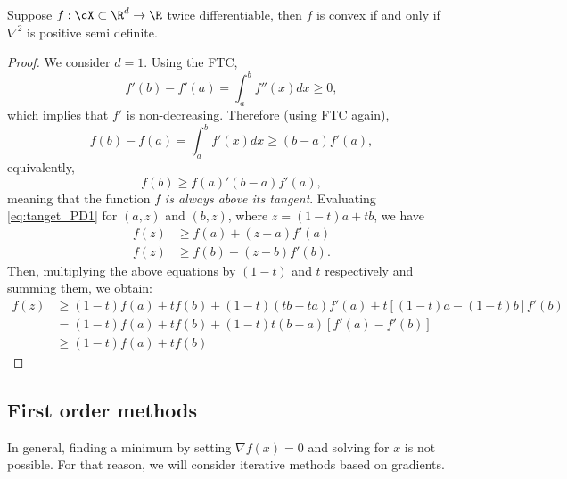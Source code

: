 \begin{theorem}
Suppose $f:\cX\subset\R^d\to\R$ twice differentiable, then $f$ is convex if and only if $\nabla^2$ is positive semi definite.
\end{theorem}
\begin{proof}
We consider $d=1$. Using the FTC, 
\begin{equation}
	f'(b) - f'(a) = \int_a^b f''(x)dx \geq 0,
 \end{equation}
 which implies that $f'$ is non-decreasing. Therefore (using FTC again),
 \begin{equation}
 	f(b) - f(a) = \int_a^b f'(x)dx \geq (b-a)f'(a),
 \end{equation}
 equivalently, 
\begin{equation}
	f(b)\geq f(a) ' (b-a)f'(a), \label{eq:tanget_PD1}
\end{equation}
meaning that the function $f$ \emph{is always above its tangent}. Evaluating \eqref{eq:tanget_PD1} for $(a,z)$ and $(b,z)$, where $z=(1-t)a + tb$, we have
\begin{align}
	f(z) &\geq f(a) + (z-a)f'(a)\\
	f(z) &\geq f(b) + (z-b)f'(b).
\end{align}
Then, multiplying the above equations by $(1-t)$ and $t$ respectively and summing them, we obtain: 
\begin{align}
	f(z) &\geq (1-t)f(a) + tf(b) + (1-t)(tb-ta)f'(a) +t[(1-t)a - (1-t)b]f'(b)\\
	     &=    (1-t)f(a) + tf(b) + (1-t)t(b-a) [f'(a) - f'(b)]\\
	     &\geq (1-t)f(a) + tf(b)
\end{align}
\end{proof}



\begin{mdframed}[style=ejemplo, frametitle={\center Example: Explore some functions}]


\end{mdframed}

\subsection{First order methods}
\label{sub:first_order_methods}

In general, finding a minimum by setting $\nabla f(x) = 0$ and solving for $x$ is not possible. For that reason, we will consider iterative methods based on gradients. 

